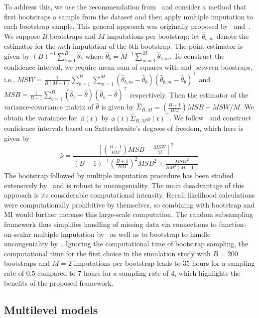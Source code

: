 \documentclass[12pt]{amsart}
\begin{document}
To address this, we use the recommendation from~\cite{Bartlett2020} and consider a method that first bootstraps a sample from the dataset and then apply multiple imputation to each bootstrap sample.  This general approach was originally proposed by~\cite{Shao1994} and~\cite{Little2002}. We suppose $B$ bootstraps and $M$ imputations per bootstrap; let $\hat \theta_{b,m}$ denote the estimator for the $m$th imputation of the $b$th bootstrap.  The point estimator is given by $(B)^{-1} \sum_{b=1}^B \hat \theta_{b}$ where $\hat \theta_b = M^{-1} \sum_{m=1}^M \hat \theta_{b,m}$. To construct the confidence interval, we require mean sum of squares with and between boostraps, i.e., $MSW = \frac{1}{B(M-1)} \sum_{b=1}^B \sum_{m=1}^M (\hat \theta_{b,m} - \hat \theta_b ) (\hat \theta_{b,m} - \hat \theta_b )^\top$ and $MSB = \frac{1}{B-1} \sum_{b=1}^B (\hat \theta_b - \hat \theta)(\hat \theta_b - \hat \theta)^\top$ respectively. Then the estimator of the variance-covariance matrix of $\hat \theta$ is given by $\hat \Sigma_{B,M} = \left( \frac{B+1}{BM} \right) MSB - MSW/M$.  We obtain the varaiance for~$\beta(t)$ by $\phi (t) \hat \Sigma_{B,M} \phi(t)^\top$.  We follow~\cite{Bartlett2020} and construct confidence intervals based on Satterthwaite’s degrees of freedom, which here is given by
$$
\hat \nu = \frac{\left[ \left( \frac{B+1}{BM} \right) MSB - \frac{MSW}{M} \right]^2}{ (B-1)^{-1} \left( \frac{B+1}{BM} \right)^2 MSB^2 + \frac{MSW^2}{BM^2(M-1)}}
$$
The bootstrap followed by multiple imputation procedure has been studied extensively by~\cite{Bartlett2020} and is robust to uncongeniality.  The main disadvantage of this approach is its considerable computational intensity.  Recall likelihood calculations were computationally prohibitive by themselves, so combining with bootstrap and MI would further increase this large-scale computation.  The random subsampling framework thus simplifies handling of missing data via connections to function-on-scalar multiple imputation by~\cite{Petrovich2018} as well as to bootstrap to handle uncongeniality by~\cite{Bartlett2020}. Ignoring the computational time of bootstrap sampling, the computational time for the first choice in the simulation study with $B=200$ bootstraps and $M=2$ imputations per bootstrap leads to $35$ hours for a sampling rate of $0.5$ compared to $7$ hours for a sampling rate of $4$, which highlights the benefits of the proposed framework.




\subsection{Multilevel models}
\end{document}
